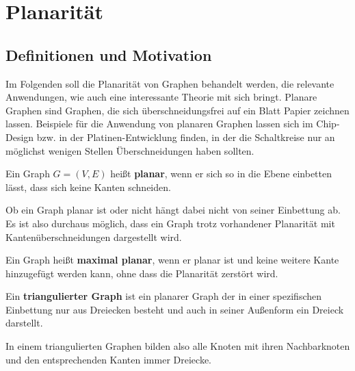 \section{Planarität}
\subsection{Definitionen und Motivation}
Im Folgenden soll die Planarität von Graphen behandelt werden, die relevante Anwendungen, wie auch eine interessante Theorie mit sich bringt. Planare Graphen sind Graphen, die sich überschneidungsfrei auf ein Blatt Papier zeichnen lassen. Beispiele für die Anwendung von planaren Graphen lassen sich im Chip-Design bzw. in der Platinen-Entwicklung finden, in der die Schaltkreise nur an möglichst wenigen Stellen Überschneidungen haben sollten.
\begin{df} Ein Graph $G=(V,E)$ heißt \textbf{planar}, wenn er sich so in die Ebene einbetten lässt, dass sich keine Kanten schneiden. \end{df}
Ob ein Graph planar ist oder nicht hängt dabei nicht von seiner Einbettung ab. Es ist also durchaus möglich, dass ein Graph trotz vorhandener Planarität mit Kantenüberschneidungen dargestellt wird.
\begin{df}Ein Graph heißt \textbf{maximal planar}, wenn er planar ist und keine weitere Kante hinzugefügt werden kann, ohne dass die Planarität zerstört wird.\end{df}
\begin{df}Ein \textbf{triangulierter Graph} ist ein planarer Graph der in einer spezifischen Einbettung nur aus Dreiecken besteht und auch in seiner Außenform ein Dreieck darstellt. \end{df}
In einem triangulierten Graphen bilden also alle Knoten mit ihren Nachbarknoten und den entsprechenden Kanten immer Dreiecke.


